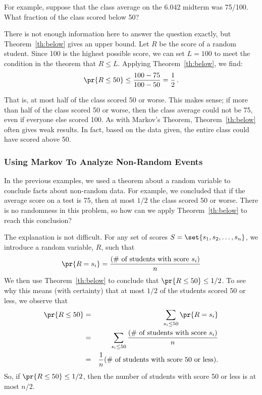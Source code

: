 \begin{editingnotes}
For example, suppose that the class average on the 6.042 midterm was
75/100.  What fraction of the class scored below 50?

There is not enough information here to answer the question exactly,
but Theorem~\ref{th:below} gives an upper bound.  Let $R$ be the score
of a random student.  Since 100 is the highest possible score, we
can set $L = 100$ to meet the condition in the theorem that $R \leq
L$.  Applying Theorem~\ref{th:below}, we find:
\begin{displaymath}
  \pr{R \leq 50} \leq \frac{100 - 75}{100 - 50} = \frac{1}{2}\,.
\end{displaymath}

That is, at most half of the class scored 50 or worse.  This makes
sense; if more than half of the class scored 50 or worse, then the
class average could not be 75, even if everyone else scored 100.
As with Markov's Theorem, Theorem~\ref{th:below} often gives weak
results.  In fact, based on the data given, the entire class could
have scored above 50.

\end{editingnotes}

\begin{editingnotes}
\subsubsection*{Using Markov To Analyze Non-Random Events}

In the previous examples, we used a theorem about a random variable to
conclude facts about non-random data.  For example, we concluded that
if the average score on a test is 75, then at most $1/2$ the
class scored 50 or worse.  There is no randomness in this problem,
so how can we apply Theorem~\ref{th:below} to reach this conclusion?

The explanation is not difficult.  For any set of scores $S = \set{s_1,
s_2, \dots, s_n}$, we introduce a random variable, $R$, such that
\[
\pr{R = s_i} = \frac{\text{(\# of students with score $s_i$)}}{n}
\]
We then use Theorem~\ref{th:below} to conclude that $\pr{R \leq 50}
\leq 1/2$.  To see why this means (with certainty) that at most
$1/2$ of the students scored 50 or less, we observe that
\begin{eqnarray*}
\pr{R \leq 50}  & = & \sum_{s_i \leq 50} \pr{R = s_i} \\
  & = & \sum_{s_i \leq 50} \frac{\text{(\# of students with score $s_i$)}}{n} \\
  & = & \frac{1}{n} \text{(\# of students with score 50 or less)}.
\end{eqnarray*}
So, if $\pr{R \leq 50} \leq 1/2$, then the number of students
with score 50 or less is at most $n/2$.

\end{editingnotes}

